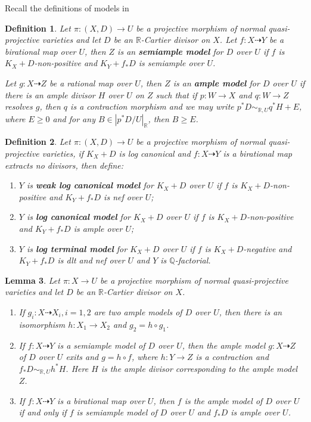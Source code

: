 \documentclass[11pt]{amsart}
\numberwithin{equation}{section}
\newtheorem{defn}{Definition}[subsection]
\newtheorem{lem}[defn]{Lemma}
\begin{document}
Recall the definitions of models in \cite{birkarExistenceMinimalModels2009}
\begin{defn}
  \cite[Definition 3.6.5]{birkarExistenceMinimalModels2009} Let $ \pi:(X,D)\to U $ be a projective morphism of normal quasi-projective varieties and let $D$ be an $\mathbb{R}$-Cartier divisor on $X$. Let $ f:X\dashrightarrow Y $ be a birational map over $ U $, then $ Z $ is an \textbf{semiample model } for $ D $ over $ U $ if $ f $ is $ K_X+D $-non-positive and $ K_Y+f_*D $ is semiample over $ U $.

  Let $ g:X\dashrightarrow Z $ be a rational map over $ U $, then $ Z $ is an \textbf{ample model } for $ D $ over $ U $ if there is  an ample divisor $H$  over $U$  on $Z$  such that if $p:W \to X $ and $q:W \to Z $ resolves $g$, then $q$ is a contraction morphism and we may write $p^*D \sim_{\mathbb{R},U} q^*H+E$, where $E\geqslant 0$ and for any $B \in |p^*D/U|_{\mathbb{R}}$, then $B\geqslant E$.
\end{defn}
\begin{defn}\label{models}
  \cite[Definition 3.6.7]{birkarExistenceMinimalModels2009} Let $ \pi:(X,D)\to U $ be a projective morphism of normal quasi-projective varieties, if $ K_X+D $ is log canonical and $ f:X\dashrightarrow Y $ is a birational map extracts no divisors, then define:
  \begin{enumerate}
    \item $ Y $ is \textbf{weak log canonical model} for $ K_X+D $ over $ U $ if $ f $ is $ K_X+D $-non-positive and $ K_Y+f_*D $ is nef over $ U $;
    \item $ Y $ is \textbf{ log canonical model} for $ K_X+D $ over $ U $ if $ f $ is $ K_X+D $-non-positive and $ K_Y+f_*D $ is ample over $ U $;
    \item $ Y $ is \textbf{ log terminal model} for $ K_X+D $ over $ U $ if $ f $ is $ K_X+D $-negative and $ K_Y+f_*D $ is dlt and nef over $ U $ and $ Y $ is $ \mathbb{Q} $-factorial.
  \end{enumerate}
\end{defn}
\begin{lem}\cite[Lemma 3.6.6]{birkarExistenceMinimalModels2009}
  Let $\pi:X \to U$ be a projective morphism of normal quasi-projective varieties and let $D$ be an $\mathbb{R}$-Cartier divisor on $X$.
  \begin{enumerate}
    \item If $g_{i}:X \dashrightarrow X_{i},i=1,2$ are two ample models of $D$ over $U$, then there is an isomorphism $h:X_{1}\to X_{2}$ and $g_{2}=h \circ g_{1}$.
    \item If $f:X \dashrightarrow Y$ is a semiample model of $D$ over $U$, then the ample model $g:X \dashrightarrow  Z$ of $D$ over $U$   exits and $g=h \circ f$, where $h:Y \to Z$ is a contraction and $f_*D \sim_{\mathbb{R},U}h^*H$. Here $H$ is the ample divisor corresponding to the ample model $Z$. 
  \item  If $f:X \dashrightarrow Y$ is a birational map over $U$, then $f$ is the ample model of $D$ over $U$ if and only if $f$ is semiample model of $D$ over $U$ and $f_*D$ is ample over $U$.     
  \end{enumerate}
\end{lem}
\end{document}
